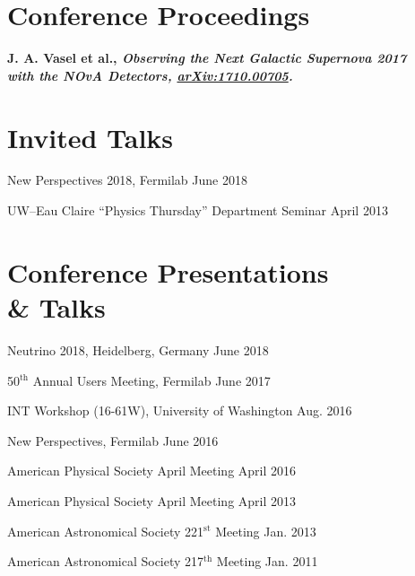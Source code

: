 \documentclass[11pt]{cv}
\begin{document}
\begin{cv}
\section{Conference Proceedings}
\begin{etaremune}
  \item \bf J. A. Vasel \rm et al., \it Observing the Next Galactic Supernova \rm \hfill 2017 \\
  \it with the NOvA Detectors, \rm \href{http://arxiv.org/abs/arXiv:1710.00705}{arXiv:1710.00705}.
\end{etaremune}


\section{Invited Talks}
\begin{etaremune}
  \item New Perspectives 2018, Fermilab \hfill June 2018
  \item UW--Eau Claire ``Physics Thursday'' Department Seminar \hfill April 2013
\end{etaremune}


\section{Conference Presentations \\ \& Talks}
\begin{etaremune}
  \item Neutrino 2018, Heidelberg, Germany \hfill June 2018
  \item 50$^{\text{th}}$ Annual Users Meeting, Fermilab \hfill June 2017
  \item INT Workshop (16-61W), University of Washington \hfill Aug. 2016
  \item New Perspectives, Fermilab \hfill June 2016
  \item American Physical Society April Meeting \hfill April 2016
  \item American Physical Society April Meeting \hfill April 2013
  \item American Astronomical Society 221${^\text{st}}$ Meeting \hfill Jan. 2013
  \item American Astronomical Society 217${^\text{th}}$ Meeting \hfill Jan. 2011
\end{etaremune}



\end{cv}
\end{document}
